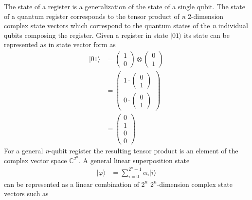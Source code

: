 The state of a register is a generalization of the state of a single qubit. The state of a quantum register corresponds to the tensor product of \textit{n} 2-dimension complex state vectors which correspond to the quantum states of the \textit{n} individual qubits composing the register. Given a register in state $\vert 01 \rangle$ its state can be represented as in state vector form as
\begin{equation*}
	\begin{split}
		\vert 01 \rangle &=
		\begin{pmatrix}
			1\\
			0
		\end{pmatrix}
		\otimes
		\begin{pmatrix}
			0\\
			1
		\end{pmatrix}\\
		&=
		\begin{pmatrix}
		1 \cdot 
			\begin{pmatrix}
			0\\
			1
			\end{pmatrix}\\
		0 \cdot
			\begin{pmatrix}
			0\\
			1
			\end{pmatrix}
		\end{pmatrix}\\
		&=
		\begin{pmatrix}
			0\\
			1\\
			0\\
			0
		\end{pmatrix}
	\end{split}
\end{equation*}
For a general \textit{n}-qubit register the resulting tensor product is an element of the complex vector space $\mathbb{C}^{2^n}$. A general linear superposition state 
\begin{align}
\vert \varphi \rangle &= \sum_{i=0}^{2^{n} - 1} \alpha_{i} \vert i \rangle
\end{align}
can be represented as a linear combination of $2^n$ $2^n$-dimension complex state vectors such as
